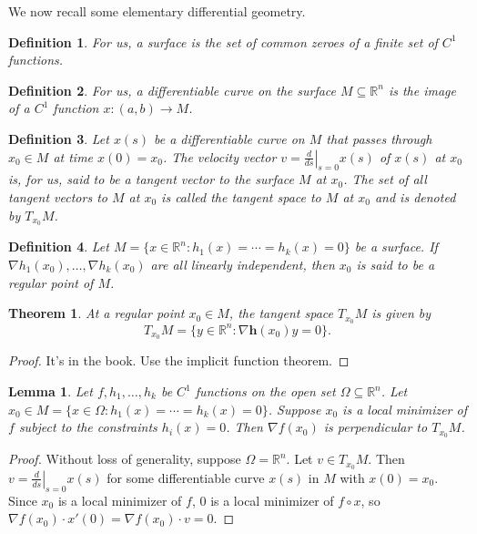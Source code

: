 \documentclass[11pt]{book}
\newcommand{\R}{\mathbb{R}}
\newtheorem{definition}{Definition}[subsection]
\newtheorem{theorem}{Theorem}[subsection]
\newtheorem{lemma}{Lemma}[subsection]
\begin{document}
We now recall some elementary differential geometry.
\begin{definition}
For us, a surface is the set of common zeroes of a finite set of $C^1$ functions. 
\end{definition}
\begin{definition}
For us, a differentiable curve on the surface $M \subseteq \R^n$ is the image of a $C^1$ function $x : (a, b) \to M$.
\end{definition}
\begin{definition}
Let $x(s)$ be a differentiable curve on $M$ that passes through $x_0 \in M$ at time $x(0) = x_0$. The velocity vector $v = \left. \frac{d}{ds} \right|_{s=0} x(s)$ of $x(s)$ at $x_0$ is, for us, said to be a tangent vector to the surface $M$ at $x_0$. The set of all tangent vectors to $M$ at $x_0$ is called the tangent space to $M$ at $x_0$ and is denoted by $T_{x_0}M$.
\end{definition}
\begin{definition}
Let $M = \{x \in \R^n : h_1(x) = \cdots = h_k(x) = 0\}$ be a surface. If $\nabla h_1(x_0), \dots, \nabla h_k(x_0)$ are all linearly independent, then $x_0$ is said to be a regular point of $M$.
\end{definition}
\begin{theorem}
At a regular point $x_0 \in M$, the tangent space $T_{x_0} M$ is given by
\[
T_{x_0} M = \{ y \in \R^n : \nabla \mathbf{h}(x_0)y = 0 \}.
\]
\end{theorem}
\begin{proof}
It's in the book. Use the implicit function theorem.
\end{proof}
\begin{lemma}
Let $f, h_1, \dots, h_k$ be $C^1$ functions on the open set $\Omega \subseteq \R^n$. Let $x_0 \in M = \{ x \in \Omega : h_1(x) = \cdots = h_k(x) = 0 \}$. Suppose $x_0$ is a local minimizer of $f$ subject to the constraints $h_i(x) = 0$. Then $\nabla f(x_0)$ is perpendicular to $T_{x_0}M$.
\end{lemma}
\begin{proof}
Without loss of generality, suppose $\Omega = \R^n$. Let $v \in T_{x_0}M$. Then $v = \left. \frac{d}{ds} \right|_{s=0}x(s)$ for some differentiable curve $x(s)$ in $M$ with $x(0) = x_0$. Since $x_0$ is a local minimizer of $f$, $0$ is a local minimizer of $f \circ x$, so $\nabla f(x_0) \cdot x'(0) = \nabla f(x_0) \cdot v = 0$.
\end{proof}

\newpage
\end{document}
